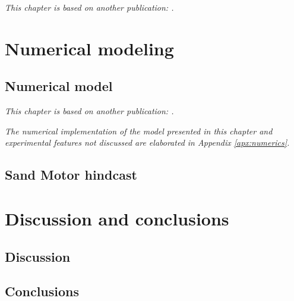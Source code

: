 \documentclass[twoside,openright,titlepage,
headinclude,footinclude,cleardoublepage=empty,
numbers=noenddot,fontsize=9pt]{scrbook}
\begin{document}
\emph{This chapter is based on another publication: .}



\cleardoublepage
{}
\part{Numerical modeling}

\chapter{Numerical model} \label{ch:model}

\emph{This chapter is based on another publication:
  .}

\bigskip

\noindent \emph{The numerical implementation of the model presented in
  this chapter and experimental features not discussed are elaborated
  in Appendix \ref{apx:numerics}.}



\chapter{Sand Motor hindcast} \label{ch:hindcast}




\cleardoublepage
\part{Discussion and conclusions}

\chapter{Discussion} \label{ch:discussion}



\chapter{Conclusions} \label{ch:conclusions}
\end{document}
